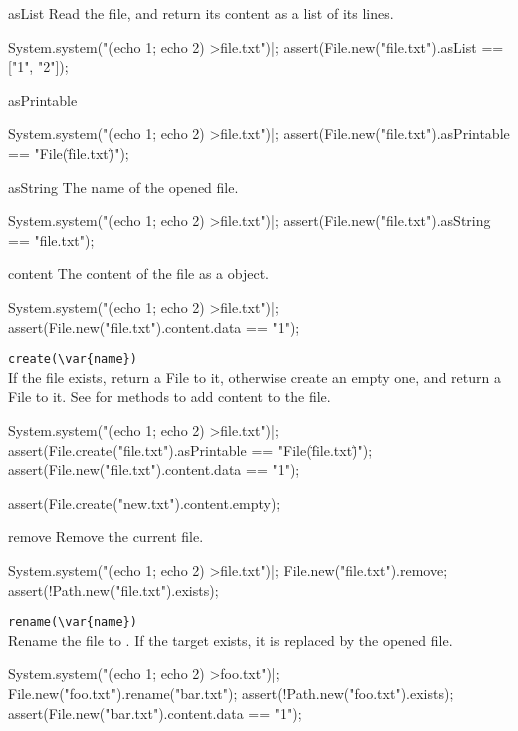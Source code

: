\begin{urbiscriptapi}
\item[asList]
  Read the file, and return its content as a list of its lines.
\begin{urbiscript}
System.system("(echo 1; echo 2) >file.txt")|;
assert(File.new("file.txt").asList == ["1", "2"]);
\end{urbiscript}

\item[asPrintable]
\begin{urbiscript}
System.system("(echo 1; echo 2) >file.txt")|;
assert(File.new("file.txt").asPrintable == "File(\"file.txt\")");
\end{urbiscript}

\item[asString]
  The name of the opened file.
\begin{urbiscript}
System.system("(echo 1; echo 2) >file.txt")|;
assert(File.new("file.txt").asString == "file.txt");
\end{urbiscript}

\item[content]
  The content of the file as a  object.
\begin{urbiscript}
System.system("(echo 1; echo 2) >file.txt")|;
assert(File.new("file.txt").content.data == "1\n");
\end{urbiscript}

\item \lstinline|create(\var{name})|\\
  If the file  exists, return a File to it, otherwise create
  an empty one, and return a File to it.  See 
  for methods to add content to the file.
\begin{urbiscript}
System.system("(echo 1; echo 2) >file.txt")|;
assert(File.create("file.txt").asPrintable == "File(\"file.txt\")");
assert(File.new("file.txt").content.data == "1\n");

assert(File.create("new.txt").content.empty);
\end{urbiscript}

\item[remove]
  Remove the current file.
\begin{urbiscript}
System.system("(echo 1; echo 2) >file.txt")|;
File.new("file.txt").remove;
assert(!Path.new("file.txt").exists);
\end{urbiscript}

\item \lstinline|rename(\var{name})|\\
  Rename the file to .  If the target exists, it is replaced by
  the opened file.
\begin{urbiscript}
System.system("(echo 1; echo 2) >foo.txt")|;
File.new("foo.txt").rename("bar.txt");
assert(!Path.new("foo.txt").exists);
assert(File.new("bar.txt").content.data == "1\n");
\end{urbiscript}


\end{urbiscriptapi}


